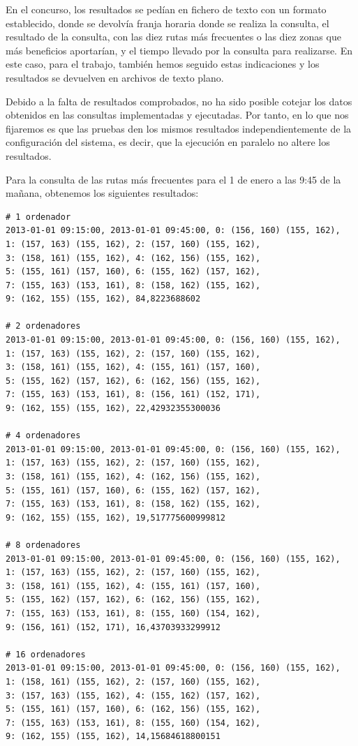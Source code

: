 En el concurso, los resultados se pedían en fichero de texto con un formato establecido, donde se devolvía franja horaria donde se realiza la consulta, el resultado de la consulta, con las diez rutas más frecuentes o las diez zonas que más beneficios aportarían, y el tiempo llevado por la consulta para realizarse. En este caso, para el trabajo, también hemos seguido estas indicaciones y los resultados se devuelven en archivos de texto plano.

Debido a la falta de resultados comprobados, no ha sido posible cotejar los datos obtenidos en las consultas implementadas y ejecutadas. Por tanto, en lo que nos fijaremos es que las pruebas den los mismos resultados independientemente de la configuración del sistema, es decir, que la ejecución en paralelo no altere los resultados.

Para la consulta de las rutas más frecuentes para el 1 de enero a las 9:45 de la mañana, obtenemos los siguientes resultados:

\begin{verbatim}
# 1 ordenador
2013-01-01 09:15:00, 2013-01-01 09:45:00, 0: (156, 160) (155, 162), 
1: (157, 163) (155, 162), 2: (157, 160) (155, 162), 
3: (158, 161) (155, 162), 4: (162, 156) (155, 162), 
5: (155, 161) (157, 160), 6: (155, 162) (157, 162), 
7: (155, 163) (153, 161), 8: (158, 162) (155, 162), 
9: (162, 155) (155, 162), 84,8223688602

# 2 ordenadores
2013-01-01 09:15:00, 2013-01-01 09:45:00, 0: (156, 160) (155, 162), 
1: (157, 163) (155, 162), 2: (157, 160) (155, 162), 
3: (158, 161) (155, 162), 4: (155, 161) (157, 160), 
5: (155, 162) (157, 162), 6: (162, 156) (155, 162), 
7: (155, 163) (153, 161), 8: (156, 161) (152, 171), 
9: (162, 155) (155, 162), 22,42932355300036

# 4 ordenadores
2013-01-01 09:15:00, 2013-01-01 09:45:00, 0: (156, 160) (155, 162), 
1: (157, 163) (155, 162), 2: (157, 160) (155, 162), 
3: (158, 161) (155, 162), 4: (162, 156) (155, 162), 
5: (155, 161) (157, 160), 6: (155, 162) (157, 162), 
7: (155, 163) (153, 161), 8: (158, 162) (155, 162), 
9: (162, 155) (155, 162), 19,517775600999812

# 8 ordenadores
2013-01-01 09:15:00, 2013-01-01 09:45:00, 0: (156, 160) (155, 162), 
1: (157, 163) (155, 162), 2: (157, 160) (155, 162), 
3: (158, 161) (155, 162), 4: (155, 161) (157, 160), 
5: (155, 162) (157, 162), 6: (162, 156) (155, 162), 
7: (155, 163) (153, 161), 8: (155, 160) (154, 162), 
9: (156, 161) (152, 171), 16,43703933299912

# 16 ordenadores
2013-01-01 09:15:00, 2013-01-01 09:45:00, 0: (156, 160) (155, 162), 
1: (158, 161) (155, 162), 2: (157, 160) (155, 162), 
3: (157, 163) (155, 162), 4: (155, 162) (157, 162), 
5: (155, 161) (157, 160), 6: (162, 156) (155, 162), 
7: (155, 163) (153, 161), 8: (155, 160) (154, 162), 
9: (162, 155) (155, 162), 14,15684618800151
\end{verbatim}


